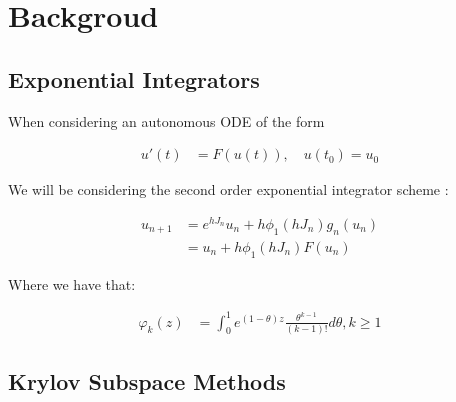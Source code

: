 \section{Backgroud}

\subsection{Exponential Integrators}

When considering an autonomous ODE of the form

\begin{align*}
    u'(t) &= F(u(t)), \quad u(t_0) = u_0
\end{align*}

We will be considering the second order exponential integrator scheme \cite{Hochbruck2009}:

\begin{align*}
    u_{n+1} &= e^{hJ_n}u_n + h\phi_1(hJ_n)g_n(u_n)\\
    &= u_n + h\phi_1(hJ_n)F(u_n)
\end{align*}

Where we have that:

\begin{align*}
    \varphi_k(z) &= \int^1_0e^{(1-\theta)z}\frac{\theta^{k-1}}{(k-1)!}d\theta, k \geq 1
\end{align*}

\subsection{Krylov Subspace Methods}

